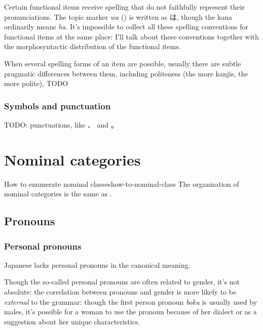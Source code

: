 \documentclass[UTF8, a4paper, oneside, scheme=plain]{ctexrep}
\newcommand*{\citechap}[1]{chap.~{#1}}
\newcommand{\corpus}[1]{\emph{#1}}
\begin{document}
Certain functional items receive spelling that do not faithfully represent their pronunciations.
The topic marker \corpus{wa} () is written as は,
though the kana ordinarily means \corpus{ha}.
It's impossible to collect all these spelling conventions for functional items at the same place:
I'll talk about these conventions together with the morphosyntactic distribution of the functional items.

When several spelling forms of an item are possible,
usually there are subtle pragmatic differences between them,
including politeness (the more kanjis, the more polite), TODO

\subsection{Symbols and punctuation}\label{sec:writing-symbols}



TODO: punctuations, like 、 and 。

\chapter{Nominal categories}

\begin{theorybox}{How to enumerate nominal classes}{how-to-nominal-class}
    The organization of nominal categories is the same as \citet[\citechap{3}, \citechap{4}]{Friesen2017}.
\end{theorybox}

\section{Pronouns}

\subsection{Personal pronouns}\label{sec:personal-pronoun}

Japanese lacks personal pronouns in the canonical meaning.

Though the so-called personal pronouns are often related to gender, 
it's not absolute: 
the correlation between pronouns and gender is more likely 
to be \emph{external} to the grammar:
though the first person pronoun \corpus{boku} is usually used by males,
it's possible for a woman to use the pronoun 
because of her dialect or
as a suggestion about her unique characteristics.
\end{document}
